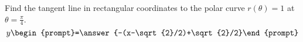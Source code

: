 \documentclass{ximera}
\author{Gregory Hartman \and Matthew Carr}
\begin{document}
\begin{exercise}





Find the tangent line in rectangular coordinates to the polar curve $r(\theta)=1$ at $\theta=\frac{\pi}{4}$. 
 \[
y\begin{prompt}=\answer{-(x-\sqrt{2}/2)+\sqrt{2}/2}\end{prompt}
 \]      
 
\end{exercise}
\end{document}
